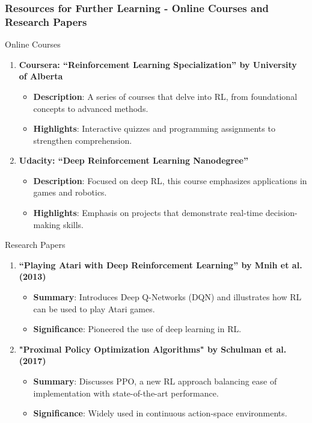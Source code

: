\documentclass[aspectratio=169]{beamer}
\begin{document}
\begin{frame}[fragile]
    \frametitle{Resources for Further Learning - Online Courses and Research Papers}
    \begin{block}{Online Courses}
        \begin{enumerate}
            \item \textbf{Coursera: “Reinforcement Learning Specialization” by University of Alberta}
                \begin{itemize}
                    \item \textbf{Description}: A series of courses that delve into RL, from foundational concepts to advanced methods.
                    \item \textbf{Highlights}: Interactive quizzes and programming assignments to strengthen comprehension.
                \end{itemize}

            \item \textbf{Udacity: “Deep Reinforcement Learning Nanodegree”}
                \begin{itemize}
                    \item \textbf{Description}: Focused on deep RL, this course emphasizes applications in games and robotics.
                    \item \textbf{Highlights}: Emphasis on projects that demonstrate real-time decision-making skills.
                \end{itemize}
        \end{enumerate}
    \end{block}

    \begin{block}{Research Papers}
        \begin{enumerate}
            \item \textbf{“Playing Atari with Deep Reinforcement Learning” by Mnih et al. (2013)}
                \begin{itemize}
                    \item \textbf{Summary}: Introduces Deep Q-Networks (DQN) and illustrates how RL can be used to play Atari games.
                    \item \textbf{Significance}: Pioneered the use of deep learning in RL.
                \end{itemize}

            \item \textbf{"Proximal Policy Optimization Algorithms" by Schulman et al. (2017)}
                \begin{itemize}
                    \item \textbf{Summary}: Discusses PPO, a new RL approach balancing ease of implementation with state-of-the-art performance.
                    \item \textbf{Significance}: Widely used in continuous action-space environments.
                \end{itemize}
        \end{enumerate}
    \end{block}
\end{frame}
\end{document}
